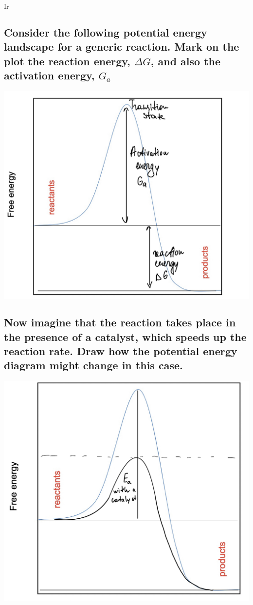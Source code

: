 Ir\documentclass{article}
\begin{document}
\subsection{Consider the following potential energy landscape for a generic reaction. Mark
on the plot the reaction energy, $ \Delta G$, and also the activation energy, $G_a$}
\begin{center}
\includegraphics[width=\textwidth,height=\textheight,keepaspectratio]{pictures/4a.jpeg}

\end{center}
\subsection{Now imagine that the reaction takes place in the presence of a catalyst, which
speeds up the reaction rate. Draw how the potential energy diagram might
change in this case.}
\begin{center}
\includegraphics[width=\textwidth,height=\textheight,keepaspectratio]{pictures/4b.jpeg}

\end{center}
\\
\end{document}
